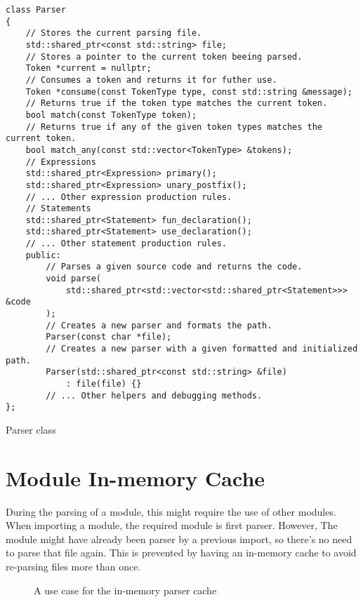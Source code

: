 \begin{listing}[H]
\begin{verbatim}
class Parser
{
    // Stores the current parsing file.
    std::shared_ptr<const std::string> file;
    // Stores a pointer to the current token beeing parsed.
    Token *current = nullptr;
    // Consumes a token and returns it for futher use.
    Token *consume(const TokenType type, const std::string &message);
    // Returns true if the token type matches the current token.
    bool match(const TokenType token);
    // Returns true if any of the given token types matches the current token.
    bool match_any(const std::vector<TokenType> &tokens);
    // Expressions
    std::shared_ptr<Expression> primary();
    std::shared_ptr<Expression> unary_postfix();
    // ... Other expression production rules.
    // Statements
    std::shared_ptr<Statement> fun_declaration();
    std::shared_ptr<Statement> use_declaration();
    // ... Other statement production rules.
    public:
        // Parses a given source code and returns the code.
        void parse(
            std::shared_ptr<std::vector<std::shared_ptr<Statement>>> &code
        );
        // Creates a new parser and formats the path.
        Parser(const char *file);
        // Creates a new parser with a given formatted and initialized path.
        Parser(std::shared_ptr<const std::string> &file)
            : file(file) {}
        // ... Other helpers and debugging methods.
};
\end{verbatim}
\caption{Parser class}
\label{ls:parser_class}
\end{listing}

\section{Module In-memory Cache}

During the parsing of a module, this might require the use of other modules. When importing a module, the required module is first
parser. However, The module might have already been parser by a previous import, so there's no need to parse that file again. This is prevented
by having an in-memory cache to avoid re-parsing files more than once.

\begin{figure}[H]
    \centering

    \caption{A use case for the in-memory parser cache}
    \label{fig:module_mem_cache}
\end{figure}


